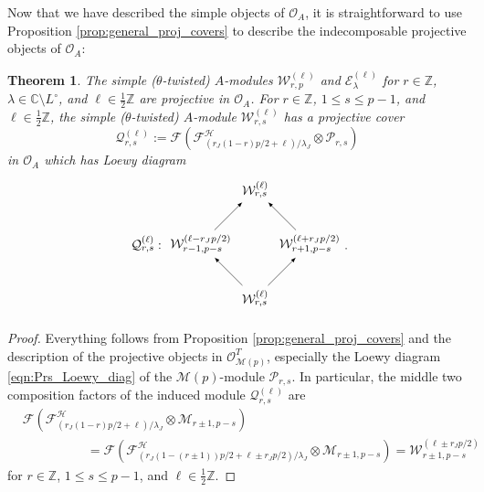 \documentclass[11pt, reqno]{amsart}
\newtheorem{thm}{Theorem}[section]
\theoremstyle{definition}\newtheorem{defi}[thm]{Definition}
\theoremstyle{definition}\newtheorem{rem}[thm]{Remark}
\theoremstyle{definition}\newtheorem{exam}[thm]{Example}
\theoremstyle{definition}\newtheorem{assum}[thm]{Assumption}
\newcommand{\cE}{\mathcal{E}}
\newcommand{\cH}{\mathcal{H}}
\newcommand{\cM}{\mathcal{M}}
\newcommand{\cF}{\mathcal{F}}
\newcommand{\cO}{\mathcal{O}}
\newcommand{\cP}{\mathcal{P}}
\newcommand{\cW}{\mathcal{W}}
\newcommand{\cQ}{\mathcal{Q}}
\newcommand{\CC}{\mathbb{C}}
\newcommand{\ZZ}{\mathbb{Z}}
\begin{document}
Now that we have described the simple objects of $\cO_A$, it is straightforward to use Proposition \ref{prop:general_proj_covers} to describe the indecomposable projective objects of $\cO_A$:
\begin{thm}\label{thm:gen_proj_covers}
The simple ($\theta$-twisted) $A$-modules $\cW_{r,p}^{(\ell)}$ and $\cE_\lambda^{(\ell)}$ for $r\in\ZZ$, $\lambda\in\CC\setminus L^\circ$, and $\ell\in\frac{1}{2}\ZZ$ are projective in $\cO_A$. For $r\in\ZZ$, $1\leq s\leq p-1$, and $\ell\in\frac{1}{2}\ZZ$, the simple ($\theta$-twisted) $A$-module $\cW_{r,s}^{(\ell)}$ has a projective cover
\begin{equation*}
\cQ_{r,s}^{(\ell)} := \cF\left(\cF^\cH_{(r_J(1-r)p/2+\ell)/\lambda_J}\otimes\cP_{r,s}\right)
\end{equation*}
in $\cO_A$ which has Loewy diagram
\begin{equation}\label{eqn:Q_rsl_Loewy_diag}
 \begin{matrix}
  \begin{tikzpicture}[->,>=latex,scale=1.5]
\node (b1) at (1,0) {$\cW_{r,s}^{(\ell)}$};
\node (c1) at (-1, 1){$\mathcal{Q}_{r,s}^{(\ell)}:$};
   \node (a1) at (0,1) {$\cW_{r-1,p-s}^{(\ell-r_J p/2)}$};
   \node (b2) at (2,1) {$\cW_{r+1,p-s}^{(\ell+r_J p/2)}$};
    \node (a2) at (1,2) {$\cW_{r,s}^{(\ell)}$};
\draw[] (b1) -- node[left] {} (a1);
   \draw[] (b1) -- node[left] {} (b2);
    \draw[] (a1) -- node[left] {} (a2);
    \draw[] (b2) -- node[left] {} (a2);
\end{tikzpicture}
\end{matrix} .
 \end{equation}
\end{thm}
\begin{proof}
Everything follows from Proposition \ref{prop:general_proj_covers} and the description of the projective objects in $\cO_{\cM(p)}^T$, especially the Loewy diagram \eqref{eqn:Prs_Loewy_diag} of the $\cM(p)$-module $\cP_{r,s}$. In particular, the middle two composition factors of the induced module $\cQ_{r,s}^{(\ell)}$ are
\begin{align*}
&\cF\left(\cF^\cH_{(r_J(1-r)p/2+\ell)/\lambda_J}\otimes\cM_{r\pm 1, p-s}\right)\nonumber\\
 & \hspace{5em} = \cF\left(\cF^\cH_{(r_J(1-(r\pm 1))p/2+\ell\pm r_J p/2)/\lambda_J}\otimes\cM_{r\pm 1,p-s}\right) =\cW_{r\pm 1, p-s}^{(\ell\pm r_J p/2)}
\end{align*}
for $r\in\ZZ$, $1\leq s\leq p-1$, and $\ell\in\frac{1}{2}\ZZ$.
\end{proof}
\end{document}
